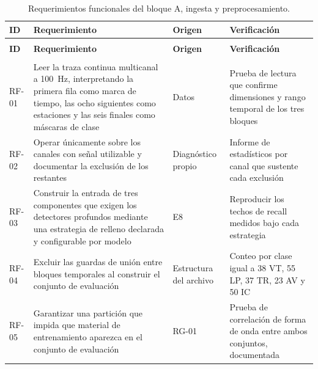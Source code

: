 {\small
\begin{longtable}{>{\raggedright\arraybackslash}p{1.2cm}>{\raggedright\arraybackslash}p{4.5cm}>{\raggedright\arraybackslash}p{2.1cm}>{\raggedright\arraybackslash}p{3.7cm}}
\caption{Requerimientos funcionales del bloque A, ingesta y preprocesamiento.}\label{tab:rf-a}\\
\toprule
\textbf{ID} & \textbf{Requerimiento} & \textbf{Origen} & \textbf{Verificación} \\
\midrule
\endfirsthead
\multicolumn{4}{l}{\itshape Cuadro \thetable{} (continuación)}\\
\toprule
\textbf{ID} & \textbf{Requerimiento} & \textbf{Origen} & \textbf{Verificación} \\
\midrule
\endhead
\midrule
\multicolumn{4}{r}{\itshape Continúa en la página siguiente}\\
\endfoot
\bottomrule
\endlastfoot
RF-01 & Leer la traza continua multicanal a 100~Hz, interpretando la primera fila
como marca de tiempo, las ocho siguientes como estaciones y las seis finales como
máscaras de clase & Datos &
Prueba de lectura que confirme dimensiones y rango temporal de los tres bloques \\
\addlinespace
RF-02 & Operar únicamente sobre los canales con señal utilizable y documentar la
exclusión de los restantes & Diagnóstico propio &
Informe de estadísticos por canal que sustente cada exclusión \\
\addlinespace
RF-03 & Construir la entrada de tres componentes que exigen los detectores
profundos mediante una estrategia de relleno declarada y configurable por modelo &
E8 & Reproducir los techos de recall medidos bajo cada estrategia \\
\addlinespace
RF-04 & Excluir las guardas de unión entre bloques temporales al construir el
conjunto de evaluación & Estructura del archivo &
Conteo por clase igual a 38 VT, 55 LP, 37 TR, 23 AV y 50 IC \\
\addlinespace
RF-05 & Garantizar una partición que impida que material de entrenamiento aparezca
en el conjunto de evaluación & RG-01 &
Prueba de correlación de forma de onda entre ambos conjuntos, documentada \\
\bottomrule
\end{longtable}
}

